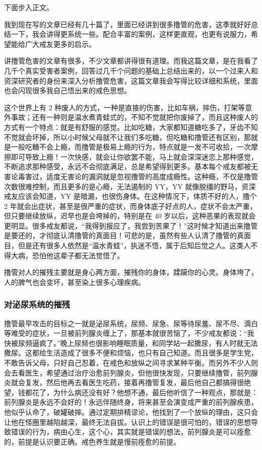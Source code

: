 \documentclass{ctexart}
\begin{document}
下面步入正文。

我到现在写的文章已经有几十篇了，里面已经讲到很多撸管的危害，这季就好好总结一下，我会讲得更系统一些。配合丰富的案例，这样更直观，也更有说服力，希望能给广大戒友更多的启示。

讲撸管危害的文章有很多，不少文章都讲得很有道理。而我这篇文章，是在我看了几千个真实受害者案例，回答过几千个问题的基础上总结出来的，以一个过来人和资深研究者的身份来深入分析撸管危害，这篇文章我会写得比较详细和系统，里面也会闪现很多我自己悟出来的戒色思想。

这个世界上有 2 种废人的方式，一种是直接的伤害，比如车祸，摔伤，打架等意外事故；还有一种则是温水煮青蛙式的，不知不觉就把你废掉了，而且这种废人的方式有一个特点：就是有舒服的感觉。比如吃糖，大家都知道糖吃多了，牙齿不知不觉就会坏掉，所以小时候父母就不让我们多吃糖，但吃糖和撸管还有区别，那就是一般吃糖不会上瘾，而撸管是极易上瘾的行为，特点就是一发不可收拾，一次摩擦即可导致上瘾！一次快感，就会让你欲罢不能，马上就会深深迷恋上那种感觉，不断追求那种感受，永远不会彻底满足，总是希望得到更多。基本每个戒友都被无害论毒害过，适度无害论的漏洞就是忽视撸管的高度成瘾性。这种瘾，不仅是撸管次数很难控制，而且更多的是心瘾，无法遏制的 YY，YY 就像脱缰的野马，资深戒友应该会知道，YY 是暗漏，也很伤身体。在这种情况下，体质不好的人，撸个 2 年就会出症状，甚至是很严重的症状，而身体底子好点的人，症状不会太严重，但只要继续放纵，迟早也是会垮掉的，特别是在 40 岁以后，这种恶果的表现就会更明显。很多戒友都说，“我得到报应了，我尝到苦果了！”这时候才知道出来撸管是要还的，才彻底认清撸管的真面目！可悲的是，虽然有些人认清了撸管的真面目，但是还有很多人依然是“温水青蛙”，执迷不悟，属于后知后觉之人。这类人不得大病，恐怕他这辈子都无法觉悟了。

撸管对人的摧残主要就是身心两方面，摧残你的身体，蹂躏你的心灵。身体垮了，人的脾气也会变坏，甚至染上很多心理疾病。

\subsubsection{对泌尿系统的摧残}

撸管最早攻击的目标之一就是泌尿系统，尿频、尿急、尿等待尿羞、尿不尽、滴白等难受的症状，一旦被前列腺炎缠上了，那基本就很苦恼了，不少戒友都说：“我快被尿频逼疯了。”晚上尿频也很影响睡眠质量，和同学站一起撒尿，有人时就无法撒尿。这都给生活造成了很多不便和烦恼，也只有自己知道。而且很多是学生党，不敢告诉父母，只好自己忍着，在戒色和放纵之间寻求某种平衡。而另外不少人则会去看医生，希望通过治疗治愈前列腺炎，但他很快发现，只要继续撸管，前列腺炎就会复发，然后他再去看医生吃药，接着再撸管复发，最后他自己都搞得很绝望，钱都花了，为什么病还没有好？他想不通，最后他听信了一种观点，那就是：前列腺炎是永远不会好的！永远伴随终身，将来甚至会演变成严重的前列腺疾患，他似乎认命了，破罐破摔。通过定期排精谬论，他找到了一个放纵的理由，这只会让他在怪圈里越陷越深，最终无法自拔。认识上的错误是很可怕的，错误的思想导致错误的行为，病由心生，这个心，其实就是错误的想法，前列腺炎是可以痊愈的，前提是认识要正确。戒色养生就是慢前痊愈的前提。
\end{document}

